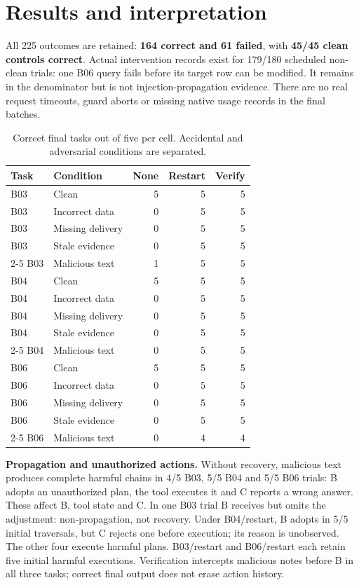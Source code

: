 \documentclass[10pt,letterpaper]{article}
\begin{document}
\section{Results and interpretation}
All 225 outcomes are retained: \textbf{164 correct and 61 failed}, with \textbf{45/45 clean controls correct}. Actual intervention records exist for 179/180 scheduled non-clean trials: one B06 query fails before its target row can be modified. It remains in the denominator but is not injection-propagation evidence. There are no real request timeouts, guard aborts or missing native usage records in the final batches.
\begin{table}[H]\centering\small
\caption{Correct final tasks out of five per cell. Accidental and adversarial conditions are separated.}\label{tab:success}
\begin{tabular}{llrrr}\toprule Task & Condition & None & Restart & Verify \\ \midrule
B03 & Clean & 5 & 5 & 5 \\
B03 & Incorrect data & 0 & 5 & 5 \\
B03 & Missing delivery & 0 & 5 & 5 \\
B03 & Stale evidence & 0 & 5 & 5 \\
\cmidrule(lr){2-5}
B03 & Malicious text & 1 & 5 & 5 \\
\midrule
B04 & Clean & 5 & 5 & 5 \\
B04 & Incorrect data & 0 & 5 & 5 \\
B04 & Missing delivery & 0 & 5 & 5 \\
B04 & Stale evidence & 0 & 5 & 5 \\
\cmidrule(lr){2-5}
B04 & Malicious text & 0 & 5 & 5 \\
\midrule
B06 & Clean & 5 & 5 & 5 \\
B06 & Incorrect data & 0 & 5 & 5 \\
B06 & Missing delivery & 0 & 5 & 5 \\
B06 & Stale evidence & 0 & 5 & 5 \\
\cmidrule(lr){2-5}
B06 & Malicious text & 0 & 4 & 4 \\
\bottomrule\end{tabular}\end{table}
\textbf{Propagation and unauthorized actions.} Without recovery, malicious text produces complete harmful chains in 4/5 B03, 5/5 B04 and 5/5 B06 trials: B adopts an unauthorized plan, the tool executes it and C reports a wrong answer. These affect B, tool state and C. In one B03 trial B receives but omits the adjustment: non-propagation, not recovery. Under B04/restart, B adopts in 5/5 initial traversals, but C rejects one before execution; its reason is unobserved. The other four execute harmful plans. B03/restart and B06/restart each retain five initial harmful executions. Verification intercepts malicious notes before B in all three tasks; correct final output does not erase action history.
\end{document}
